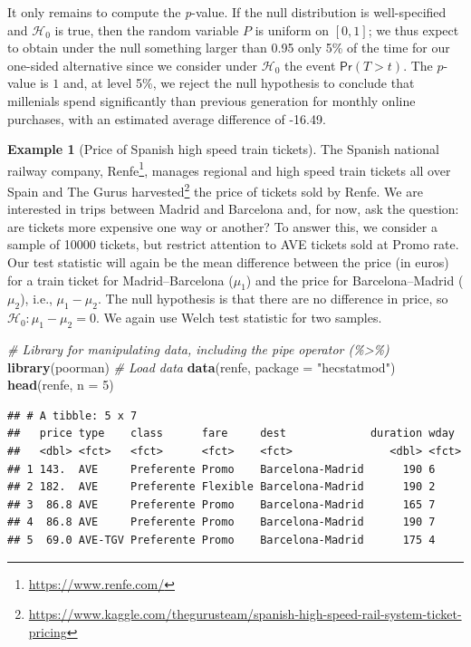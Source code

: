 \documentclass[
  11pt,
  letterpaper,
]{book}
\newenvironment{Shaded}{\begin{snugshade}}{\end{snugshade}}
\newcommand{\CommentTok}[1]{\textcolor[rgb]{0.56,0.35,0.01}{\textit{#1}}}
\newcommand{\DataTypeTok}[1]{\textcolor[rgb]{0.13,0.29,0.53}{#1}}
\newcommand{\DecValTok}[1]{\textcolor[rgb]{0.00,0.00,0.81}{#1}}
\newcommand{\KeywordTok}[1]{\textcolor[rgb]{0.13,0.29,0.53}{\textbf{#1}}}
\newcommand{\NormalTok}[1]{#1}
\newcommand{\StringTok}[1]{\textcolor[rgb]{0.31,0.60,0.02}{#1}}
\renewcommand{\href}[2]{#2\footnote{\url{#1}}}
\theoremstyle{definition}
\theoremstyle{definition}
\newtheorem{example}{Example}[chapter]
\theoremstyle{definition}
\theoremstyle{remark}
\begin{document}
It only remains to compute the \emph{p}-value. If the null distribution is well-specified and \(\mathscr{H}_0\) is true, then the random variable \(P\) is uniform on \([0, 1]\); we thus expect to obtain under the null something larger than 0.95 only 5\% of the time for our one-sided alternative since we consider under \(\mathscr{H}_0\) the event \(\mathsf{Pr}(T > t)\). The \(p\)-value is \(1\) and, at level 5\%, we reject the null hypothesis to conclude that millenials spend significantly than previous generation for monthly online purchases, with an estimated average difference of -16.49.

\begin{example}[Price of Spanish high speed train tickets]
\protect\hypertarget{exm:price-trains-tests}{}{\label{exm:price-trains-tests} {} }The Spanish national railway company, \href{https://www.renfe.com/}{Renfe}, manages regional and high speed train tickets all over Spain and The Gurus \href{https://www.kaggle.com/thegurusteam/spanish-high-speed-rail-system-ticket-pricing}{harvested} the price of tickets sold by Renfe. We are interested in trips between Madrid and Barcelona and, for now, ask the question: are tickets more expensive one way or another? To answer this, we consider a sample of 10000 tickets, but restrict attention to AVE tickets sold at Promo rate. Our test statistic will again be the mean difference between the price (in euros) for a train ticket for Madrid--Barcelona (\(\mu_1\)) and the price for Barcelona--Madrid (\(\mu_2\)), i.e., \(\mu_1-\mu_2\). The null hypothesis is that there are no difference in price, so \(\mathscr{H}_0: \mu_1-\mu_2=0\). We again use Welch test statistic for two samples.
\end{example}

\begin{Shaded}
\begin{Highlighting}[]
\CommentTok{\# Library for manipulating data, including the pipe operator (\%\textgreater{}\%)}
\KeywordTok{library}\NormalTok{(poorman)}
\CommentTok{\# Load data}
\KeywordTok{data}\NormalTok{(renfe, }\DataTypeTok{package =} \StringTok{"hecstatmod"}\NormalTok{)}
\KeywordTok{head}\NormalTok{(renfe, }\DataTypeTok{n =} \DecValTok{5}\NormalTok{)}
\end{Highlighting}
\end{Shaded}

\begin{verbatim}
## # A tibble: 5 x 7
##   price type    class      fare     dest             duration wday 
##   <dbl> <fct>   <fct>      <fct>    <fct>               <dbl> <fct>
## 1 143.  AVE     Preferente Promo    Barcelona-Madrid      190 6    
## 2 182.  AVE     Preferente Flexible Barcelona-Madrid      190 2    
## 3  86.8 AVE     Preferente Promo    Barcelona-Madrid      165 7    
## 4  86.8 AVE     Preferente Promo    Barcelona-Madrid      190 7    
## 5  69.0 AVE-TGV Preferente Promo    Barcelona-Madrid      175 4
\end{verbatim}
\end{document}
